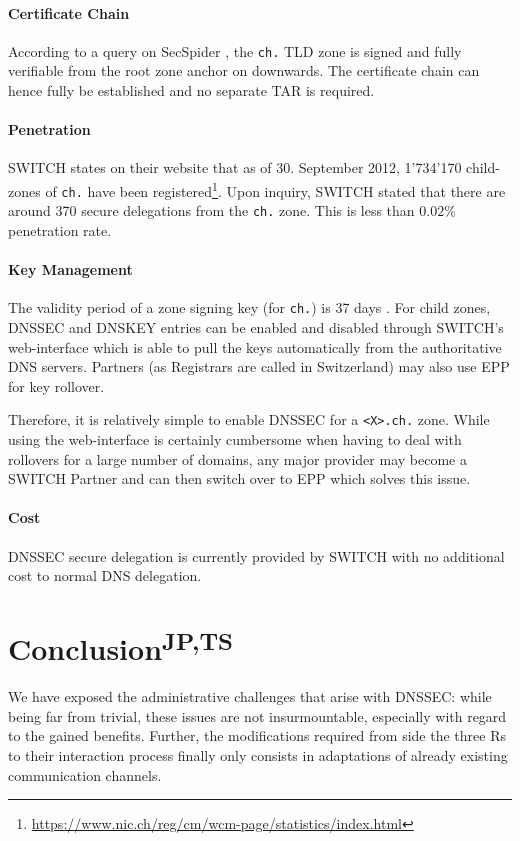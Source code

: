 \documentclass[a4paper,twocolumn]{scrartcl}
\newcommand{\wbjpts}{\textsuperscript{JP,TS}}
\begin{document}
\paragraph{Certificate Chain} According to a query on SecSpider
\cite{secspider}, the \verb|ch.| TLD zone is signed and fully
verifiable from the root zone anchor on downwards. The certificate
chain can hence fully be established and no separate TAR is required.

\paragraph{Penetration} SWITCH states on their website that as of
30. September 2012, 1'734'170 child-zones of \verb|ch.| have been
registered\footnote{\url{https://www.nic.ch/reg/cm/wcm-page/statistics/index.html}}. Upon
inquiry, SWITCH stated that there are around 370 secure delegations
from the \verb|ch.| zone. This is less than $0.02\%$ penetration
rate.

\paragraph{Key Management} The validity period of a zone signing key
(for \verb|ch.|) is 37 days \cite{switch10}. For child zones,  DNSSEC
and DNSKEY entries can be enabled and disabled through SWITCH's 
web-interface which is able to pull the keys automatically from the
authoritative DNS servers. Partners (as Registrars are called in
Switzerland) may also use EPP for key rollover.

Therefore, it is relatively simple to enable DNSSEC for a \verb|<X>.ch.| 
zone. While using the web-interface is certainly cumbersome when
having to deal with rollovers for a large number of domains, any major
provider may become a SWITCH Partner and can then switch over to EPP
which solves this issue.


\paragraph{Cost} DNSSEC secure delegation is currently provided by
SWITCH with no additional cost to normal DNS delegation.

\section{Conclusion\wbjpts}
We have exposed the administrative challenges that arise with DNSSEC:
while being far from trivial, these issues are not insurmountable,
especially with regard to the gained benefits. Further, the
modifications required from side the three Rs to their interaction
process finally only consists in adaptations of already existing
communication channels.
\end{document}
